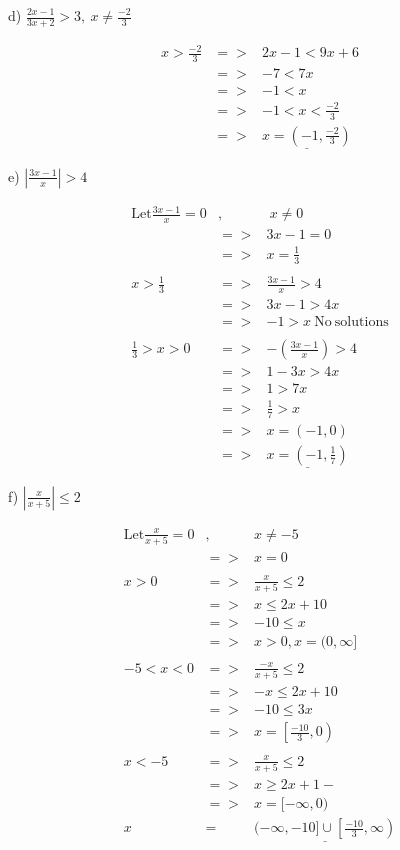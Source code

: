 \documentclass[11pt]{article}
\begin{document}
\begin{flushleft} d) $\displaystyle{\frac{2x-1}{3x+2}>3,\ x\neq \frac{-2}{3}} $ \end{flushleft}
\begin{eqnarray*}
x>\frac{-2}{3}&=>&2x-1<9x+6\\
&=>&-7<7x\\
&=>&-1<x\\
&=>&-1<x<\frac{-2}{3}\\
&=>&\underline{x=\left(-1, \frac{-2}{3}\right)}
\end{eqnarray*}

\begin{flushleft} e) $\displaystyle{\left|\frac{3x-1}{x}\right|>4} $ \end{flushleft}
\begin{eqnarray*}
\mathrm{Let} \frac{3x-1}{x}=0&,&\ x\neq 0\\
&=>&3x-1=0\\
&=>&x=\frac{1}{3}\\
\\x>\frac{1}{3}&=>&\frac{3x-1}{x}>4\\
&=>&3x-1>4x\\
&=>&-1>x \mathrm{\ No\ solutions}\\
\\\frac{1}{3}>x>0&=>&-\left(\frac{3x-1}{x}\right)>4\\
&=>&1-3x>4x\\
&=>&1>7x\\
&=>&\frac{1}{7}>x\\
&=>&x=(-1, 0)\\
&=>&\underline{x=\left(-1, \frac{1}{7}\right)}
\end{eqnarray*}

\begin{flushleft} f) $\displaystyle{\left|\frac{x}{x+5}\right|\leq 2} $ \end{flushleft}
\begin{eqnarray*}
\mathrm{Let} \frac{x}{x+5}=0&,&x\neq -5\\
&=>&x=0\\
\\x>0&=>&\frac{x}{x+5}\leq 2\\
&=>&x\leq 2x+10\\
&=>&-10\leq x\\
&=>&x>0,x=(0,\infty]\\
\\-5<x<0&=>&\frac{-x}{x+5}\leq 2\\
&=>&-x\leq 2x+10\\
&=>&-10\leq 3x\\
&=>&x=\left[\frac{-10}{3}, 0\right)\\
\\x<-5&=>&\frac{x}{x+5}\leq 2\\
&=>&x\geq 2x+1-\\
&=>&x=[-\infty, 0)\\
x&=&\underline{(-\infty, -10] \cup \left[\frac{-10}{3}, \infty\right)}
\end{eqnarray*}
\end{document}
